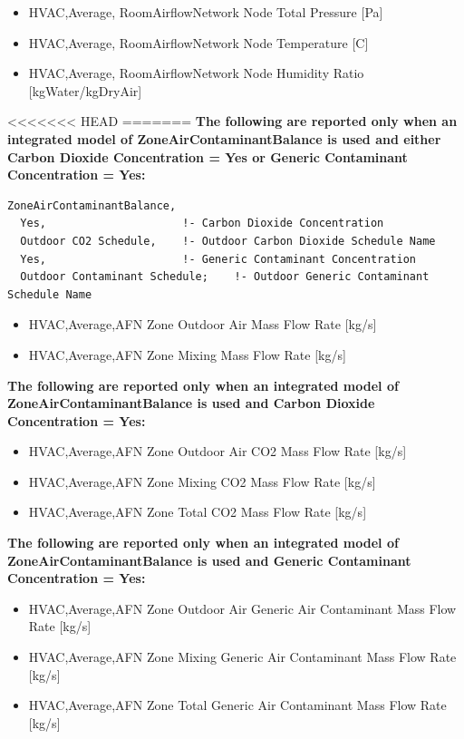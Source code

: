 \begin{itemize}
\item
  HVAC,Average, RoomAirflowNetwork Node Total Pressure {[}Pa{]}
\item
  HVAC,Average, RoomAirflowNetwork Node Temperature {[}C{]}
\item
  HVAC,Average, RoomAirflowNetwork Node Humidity Ratio {[}kgWater/kgDryAir{]}
\end{itemize}

<<<<<<< HEAD
=======
\textbf{The following are reported only when an integrated model of ZoneAirContaminantBalance is used and either Carbon Dioxide Concentration = Yes or Generic Contaminant Concentration = Yes:}

\begin{lstlisting}
ZoneAirContaminantBalance,
  Yes,                     !- Carbon Dioxide Concentration
  Outdoor CO2 Schedule,    !- Outdoor Carbon Dioxide Schedule Name
  Yes,                     !- Generic Contaminant Concentration
  Outdoor Contaminant Schedule;    !- Outdoor Generic Contaminant Schedule Name
\end{lstlisting}

\begin{itemize}
\item
  HVAC,Average,AFN Zone Outdoor Air Mass Flow Rate {[}kg/s{]}
\item
  HVAC,Average,AFN Zone Mixing Mass Flow Rate {[}kg/s{]}

\end{itemize}

\textbf{The following are reported only when an integrated model of ZoneAirContaminantBalance is used and Carbon Dioxide Concentration = Yes:}

\begin{itemize}
\item
  HVAC,Average,AFN Zone Outdoor Air CO2 Mass Flow Rate {[}kg/s{]}
\item
  HVAC,Average,AFN Zone Mixing CO2 Mass Flow Rate {[}kg/s{]}
\item
  HVAC,Average,AFN Zone Total CO2 Mass Flow Rate {[}kg/s{]}
\end{itemize}

\textbf{The following are reported only when an integrated model of ZoneAirContaminantBalance is used and Generic Contaminant Concentration = Yes:}

\begin{itemize}
\item
  HVAC,Average,AFN Zone Outdoor Air Generic Air Contaminant Mass Flow Rate {[}kg/s{]}
\item
  HVAC,Average,AFN Zone Mixing Generic Air Contaminant Mass Flow Rate {[}kg/s{]}
\item
  HVAC,Average,AFN Zone Total Generic Air Contaminant Mass Flow Rate {[}kg/s{]}

\end{itemize}


